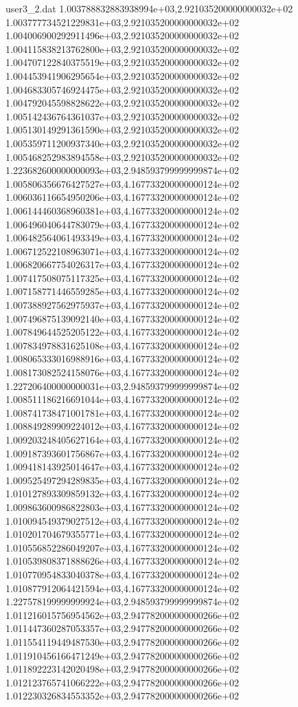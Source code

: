\begin{filecontents}{user3_2.dat}
1.003788832883938994e+03,2.921035200000000032e+02
1.003777734521229831e+03,2.921035200000000032e+02
1.004006900292911496e+03,2.921035200000000032e+02
1.004115838213762800e+03,2.921035200000000032e+02
1.004707122840375519e+03,2.921035200000000032e+02
1.004453941906295654e+03,2.921035200000000032e+02
1.004683305746924475e+03,2.921035200000000032e+02
1.004792045598828622e+03,2.921035200000000032e+02
1.005142436764361037e+03,2.921035200000000032e+02
1.005130149291361590e+03,2.921035200000000032e+02
1.005359711200937340e+03,2.921035200000000032e+02
1.005468252983894558e+03,2.921035200000000032e+02
1.223682600000000093e+03,2.948593799999999874e+02
1.005806356676427527e+03,4.167733200000000124e+02
1.006036116654950206e+03,4.167733200000000124e+02
1.006144460368960381e+03,4.167733200000000124e+02
1.006496040644783079e+03,4.167733200000000124e+02
1.006482564061493349e+03,4.167733200000000124e+02
1.006712522108963071e+03,4.167733200000000124e+02
1.006820667754026317e+03,4.167733200000000124e+02
1.007417508075117325e+03,4.167733200000000124e+02
1.007158771446559285e+03,4.167733200000000124e+02
1.007388927562975937e+03,4.167733200000000124e+02
1.007496875139092140e+03,4.167733200000000124e+02
1.007849644525205122e+03,4.167733200000000124e+02
1.007834978831625108e+03,4.167733200000000124e+02
1.008065333016988916e+03,4.167733200000000124e+02
1.008173082524158076e+03,4.167733200000000124e+02
1.227206400000000031e+03,2.948593799999999874e+02
1.008511186216691044e+03,4.167733200000000124e+02
1.008741738471001781e+03,4.167733200000000124e+02
1.008849289909224012e+03,4.167733200000000124e+02
1.009203248405627164e+03,4.167733200000000124e+02
1.009187393601756867e+03,4.167733200000000124e+02
1.009418143925014647e+03,4.167733200000000124e+02
1.009525497294289835e+03,4.167733200000000124e+02
1.010127893309859132e+03,4.167733200000000124e+02
1.009863600986822803e+03,4.167733200000000124e+02
1.010094549379027512e+03,4.167733200000000124e+02
1.010201704679355771e+03,4.167733200000000124e+02
1.010556852286049207e+03,4.167733200000000124e+02
1.010539808371888626e+03,4.167733200000000124e+02
1.010770954833040378e+03,4.167733200000000124e+02
1.010877912064421594e+03,4.167733200000000124e+02
1.227578199999999924e+03,2.948593799999999874e+02
1.011216015756954562e+03,2.947782000000000266e+02
1.011447360287053357e+03,2.947782000000000266e+02
1.011554119449487530e+03,2.947782000000000266e+02
1.011910456166471249e+03,2.947782000000000266e+02
1.011892223142020498e+03,2.947782000000000266e+02
1.012123765741066222e+03,2.947782000000000266e+02
1.012230326834553352e+03,2.947782000000000266e+02

\end{filecontents}

